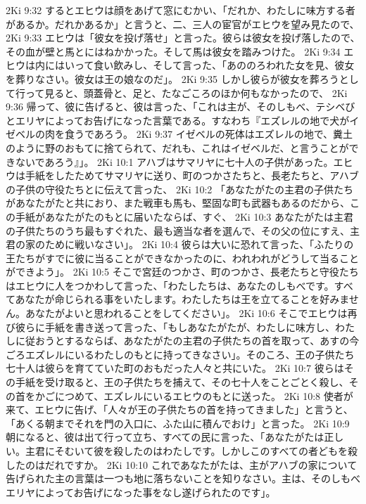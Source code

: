 2Ki 9:32  するとエヒウは顔をあげて窓にむかい、「だれか、わたしに味方する者があるか。だれかあるか」と言うと、二、三人の宦官がエヒウを望み見たので、
2Ki 9:33  エヒウは「彼女を投げ落せ」と言った。彼らは彼女を投げ落したので、その血が壁と馬とにはねかかった。そして馬は彼女を踏みつけた。
2Ki 9:34  エヒウは内にはいって食い飲みし、そして言った、「あののろわれた女を見、彼女を葬りなさい。彼女は王の娘なのだ」。
2Ki 9:35  しかし彼らが彼女を葬ろうとして行って見ると、頭蓋骨と、足と、たなごころのほか何もなかったので、
2Ki 9:36  帰って、彼に告げると、彼は言った、「これは主が、そのしもべ、テシベびとエリヤによってお告げになった言葉である。すなわち『エズレルの地で犬がイゼベルの肉を食うであろう。
2Ki 9:37  イゼベルの死体はエズレルの地で、糞土のように野のおもてに捨てられて、だれも、これはイゼベルだ、と言うことができないであろう』」。
2Ki 10:1  アハブはサマリヤに七十人の子供があった。エヒウは手紙をしたためてサマリヤに送り、町のつかさたちと、長老たちと、アハブの子供の守役たちとに伝えて言った、
2Ki 10:2  「あなたがたの主君の子供たちがあなたがたと共におり、また戦車も馬も、堅固な町も武器もあるのだから、この手紙があなたがたのもとに届いたならば、すぐ、
2Ki 10:3  あなたがたは主君の子供たちのうち最もすぐれた、最も適当な者を選んで、その父の位にすえ、主君の家のために戦いなさい」。
2Ki 10:4  彼らは大いに恐れて言った、「ふたりの王たちがすでに彼に当ることができなかったのに、われわれがどうして当ることができよう」。
2Ki 10:5  そこで宮廷のつかさ、町のつかさ、長老たちと守役たちはエヒウに人をつかわして言った、「わたしたちは、あなたのしもべです。すべてあなたが命じられる事をいたします。わたしたちは王を立てることを好みません。あなたがよいと思われることをしてください」。
2Ki 10:6  そこでエヒウは再び彼らに手紙を書き送って言った、「もしあなたがたが、わたしに味方し、わたしに従おうとするならば、あなたがたの主君の子供たちの首を取って、あすの今ごろエズレルにいるわたしのもとに持ってきなさい」。そのころ、王の子供たち七十人は彼らを育てていた町のおもだった人々と共にいた。
2Ki 10:7  彼らはその手紙を受け取ると、王の子供たちを捕えて、その七十人をことごとく殺し、その首をかごにつめて、エズレルにいるエヒウのもとに送った。
2Ki 10:8  使者が来て、エヒウに告げ、「人々が王の子供たちの首を持ってきました」と言うと、「あくる朝までそれを門の入口に、ふた山に積んでおけ」と言った。
2Ki 10:9  朝になると、彼は出て行って立ち、すべての民に言った、「あなたがたは正しい。主君にそむいて彼を殺したのはわたしです。しかしこのすべての者どもを殺したのはだれですか。
2Ki 10:10  これであなたがたは、主がアハブの家について告げられた主の言葉は一つも地に落ちないことを知りなさい。主は、そのしもべエリヤによってお告げになった事をなし遂げられたのです」。
